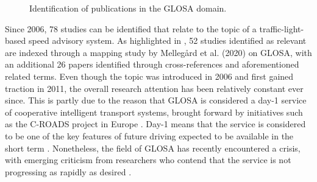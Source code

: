 \begin{figure}[t]
\centering
{}
\caption{Identification of publications in the GLOSA domain.}
\label{fig:related-work-research-method}
\end{figure}

Since 2006, 78 studies can be identified that relate to the topic of a traffic-light-based speed advisory system. As highlighted in , 52 studies identified as relevant are indexed through a mapping study by Mellegård et al. (2020) \cite{mellegard_day_2020} on GLOSA, with an additional 26 papers identified through cross-references and aforementioned related terms. Even though the topic was introduced in 2006 and first gained traction in 2011, the overall research attention has been relatively constant ever since. This is partly due to the reason that GLOSA is considered a day-1 service of cooperative intelligent transport systems, brought forward by initiatives such as the C-ROADS project in Europe \cite{sharara_impact_2019}. Day-1 means that the service is considered to be one of the key features of future driving expected to be available in the short term \cite{mellegard_day_2020}. Nonetheless, the field of GLOSA has recently encountered a crisis, with emerging criticism from researchers who contend that the service is not progressing as rapidly as desired \cite{mellegard_day_2020, otto_framework_2023}.

